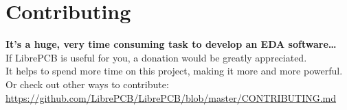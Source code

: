 \section{Contributing}

\begin{frame}{\secname}
  \begin{centering}
    \bigskip \bigskip
    \textbf{\large{It's a huge, very time consuming task to develop an EDA software\ldots}}\\
    \bigskip \bigskip
    If LibrePCB is useful for you, a donation would be greatly appreciated.\\
    It helps to spend more time on this project, making it more and more
    powerful.\\
    \bigskip \bigskip
    {
      Or check out other ways to contribute:\\
      \footnotesize
      \url{https://github.com/LibrePCB/LibrePCB/blob/master/CONTRIBUTING.md}
    }\\
  \end{centering}
\end{frame}
